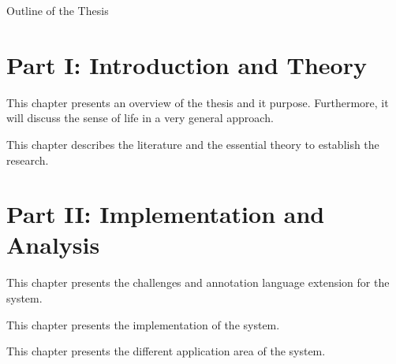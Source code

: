 \clearemptydoublepage

{}

\begin{center}
	\huge{Outline of the Thesis}
\end{center}




\section*{Part I: Introduction and Theory}

  \vspace{1mm}

\noindent  This chapter presents an overview of the thesis and it purpose. Furthermore, it will discuss the sense of life in a very general approach.  \\

  \vspace{1mm}

\noindent  This chapter describes the literature and the essential theory to establish the research.   \\

\section*{Part II: Implementation and Analysis}

  \vspace{1mm}

\noindent  This chapter presents the challenges and annotation language extension for the system.

  \vspace{1mm}

\noindent  This chapter presents the implementation of the system.

  \vspace{1mm}

\noindent  This chapter presents the different application area of the system.

  \vspace{1mm}

